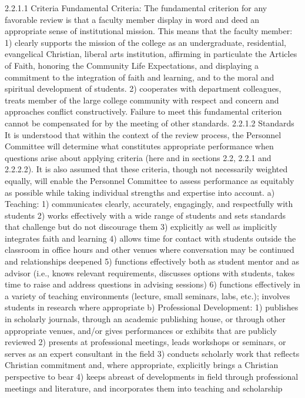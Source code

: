 \documentclass[letterpaper, 11pt]{article}
\begin{document}
2.2.1.1 Criteria 
   Fundamental Criteria: The fundamental criterion for any favorable review is that a faculty member display in word and deed an appropriate sense of institutional mission. This means that the faculty member:
1) clearly supports the mission of the college as an undergraduate, residential, evangelical Christian, liberal arts institution, affirming in particulate the Articles of Faith, honoring the Community Life Expectations, and displaying a commitment to the integration of faith and learning, and to the moral and spiritual development of students.
2) cooperates with department colleagues, treats member of the large college community with respect and concern and approaches conflict constructively.
Failure to meet this fundamental criterion cannot be compensated for by the meeting of other standards.
2.2.1.2 Standards
   It is understood that within the context of the review process, the Personnel Committee will determine what constitutes appropriate performance when questions arise about applying criteria (here and in sections 2.2, 2.2.1 and 2.2.2.2).  It is also assumed that these criteria, though not necessarily weighted equally, will enable the Personnel Committee to assess performance as equitably as possible while taking individual strengths and expertise into account.
a) Teaching:
1) communicates clearly, accurately, engagingly, and respectfully with students
2) works effectively with a wide range of students and sets standards that challenge but do not discourage them
3) explicitly as well as implicitly integrates faith and learning
4) allows time for contact with students outside the classroom in office hours and other venues where conversation may be continued and relationships deepened
5) functions effectively both as student mentor and as advisor (i.e., knows relevant requirements, discusses options with students, takes time to raise and address questions in advising sessions)
6) functions effectively in a variety of teaching environments (lecture, small seminars, labs, etc.); involves students in research where appropriate
b) Professional Development:
1) publishes in scholarly journals, through an academic publishing house, or through other appropriate venues, and/or gives performances or exhibits that are publicly reviewed
2) presents at professional meetings, leads workshops or seminars, or serves as an expert consultant in the field
3) conducts scholarly work that reflects Christian commitment and, where appropriate, explicitly brings a Christian perspective to bear
4) keeps abreast of developments in field through professional meetings and literature, and incorporates them into teaching and scholarship
\end{document}
